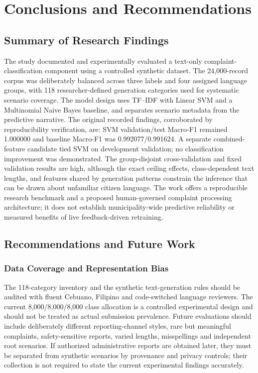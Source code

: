 \chapter{Conclusions and Recommendations}
\section{Summary of Research Findings}
The study documented and experimentally evaluated a text-only complaint-classification component using a controlled synthetic dataset. The 24,000-record corpus was deliberately balanced across three labels and four assigned language groups, with 118 researcher-defined generation categories used for systematic scenario coverage. The model design uses TF--IDF with Linear SVM and a Multinomial Naive Bayes baseline, and separates scenario metadata from the predictive narrative. The original recorded findings, corroborated by reproducibility verification, are: SVM validation/test Macro-F1 remained 1.000000 and baseline Macro-F1 was 0.992077/0.991624. A separate combined-feature candidate tied SVM on development validation; no classification improvement was demonstrated. The group-disjoint cross-validation and fixed validation results are high, although the exact ceiling effects, class-dependent text lengths, and features shared by generation patterns constrain the inference that can be drawn about unfamiliar citizen language. The work offers a reproducible research benchmark and a proposed human-governed complaint processing architecture; it does not establish municipality-wide predictive reliability or measured benefits of live feedback-driven retraining.

\section{Recommendations and Future Work}
\subsection{Data Coverage and Representation Bias}
The 118-category inventory and the synthetic text-generation rules should be audited with fluent Cebuano, Filipino and code-switched language reviewers. The current 8,000/8,000/8,000 class allocation is a controlled experimental design and should not be treated as actual submission prevalence. Future evaluations should include deliberately different reporting-channel styles, rare but meaningful complaints, safety-sensitive reports, varied lengths, misspellings and independent root scenarios. If authorized administrative reports are obtained later, they must be separated from synthetic scenarios by provenance and privacy controls; their collection is not required to state the current experimental findings accurately.

